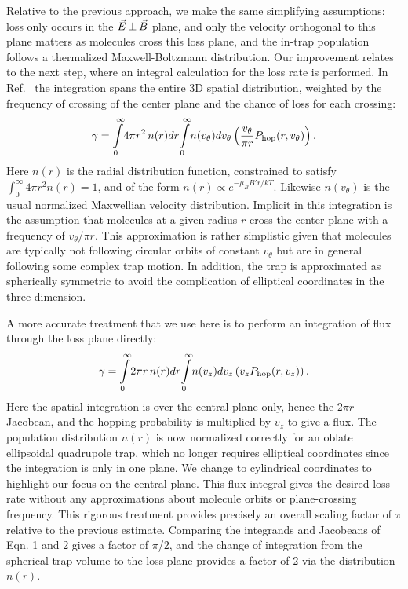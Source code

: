 \documentclass[%
 reprint,
 amsmath,amssymb,
 aps,
pra,
]{revtex4-1}
\newcommand{\epb}{{$\vec{E}\s {\perp}\s\vec{B}$}}
\newcommand{\s}{{\nobreak\hspace{.2em}}}
\begin{document}
Relative to the previous approach, we make the same simplifying assumptions: loss only occurs in the \epb{} plane, and only the velocity orthogonal to this plane matters as molecules cross this loss plane, and the in-trap population follows a thermalized Maxwell-Boltzmann distribution.
Our improvement relates to the next step, where an integral calculation for the loss rate is performed.
In Ref.~\cite{Stuhl2013} the integration spans the entire 3D spatial distribution, weighted by the frequency of crossing of the center plane and the chance of loss for each crossing:
\begin{equation}
\gamma=\int\displaylimits_0^\infty\!4\pi r^2\,n(r)dr\!\int\displaylimits_0^\infty \!n(v_\theta)dv_\theta\left( \frac{v_\theta}{\pi r} P_\text{hop}(r,v_\theta)\right).
\end{equation}
Here $n(r)$ is the radial distribution function, constrained to satisfy $\int_0^\infty 4\pi r^2n(r)=1$, and of the form $n(r)\propto e^{-\mu_BB' r/kT}$. Likewise $n(v_\theta)$ is the usual normalized Maxwellian velocity distribution.  Implicit in this integration is the assumption that molecules at a given radius $r$ cross the center plane with a frequency of $v_\theta/\pi r$.
This approximation is rather simplistic given that molecules are typically not following circular orbits of constant $v_\theta$ but are in general following some complex trap motion. In addition, the trap is approximated as spherically symmetric to avoid the complication of elliptical coordinates in the three dimension.

A more accurate treatment that we use here is to perform an integration of flux through the loss plane directly:
\begin{equation}
\label{eq:fullInt}
\gamma=\int\displaylimits_0^\infty\!2\pi r \,n(r)dr\!\int\displaylimits_0^\infty\! n(v_z)dv_z\left(v_z P_\text{hop}(r,v_z)\right).
\end{equation}
Here the spatial integration is over the central plane only, hence the $2\pi r$ Jacobean, and the hopping probability is multiplied by $v_z$ to give a flux. The population distribution $n(r)$ is now normalized correctly for an oblate ellipsoidal quadrupole trap, which no longer requires elliptical coordinates since the integration is only in one plane. We change to cylindrical coordinates to highlight our focus on the central plane.
This flux integral gives the desired loss rate without any approximations about molecule orbits or plane-crossing frequency. This rigorous treatment provides precisely an overall scaling factor of $\pi$ relative to the previous estimate. Comparing the integrands and Jacobeans of Eqn. 1 and 2 gives a factor of $\pi$/2, and the change of integration from the spherical trap volume to the loss plane provides a factor of 2 via the distribution $n(r)$.
\end{document}
